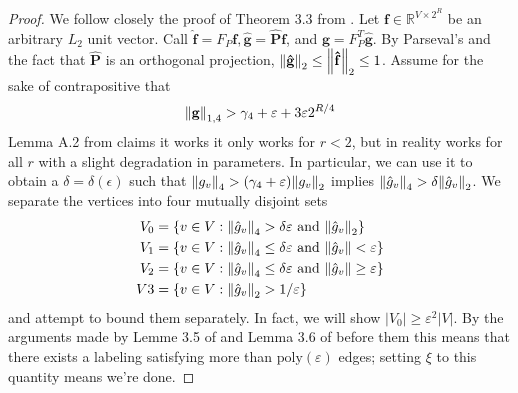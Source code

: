 \documentclass[10pt]{article}
\newcommand{\R}{\mathbb{R}}
\newcommand{\mbf}[1]{\mathbf{ #1 }}
\newcommand{\veps}{\varepsilon}
\begin{document}
\begin{proof}
We follow closely the proof of Theorem 3.3 from \cite{pqalmost}. Let $\mbf{f} \in \R^{V \times 2^R}$ be an arbitrary $L_2$ unit vector. Call $\mbf{\hat{f}} = F_P \mbf{f}, \mbf{\hat{g}} = \mbf{\hat{P}} \mbf{f}$, and $\mbf{g} = F_P^T \mbf{\hat{g}}$. By Parseval's and the fact that $\mbf{\hat{P}}$ is an orthogonal projection, $\norm{\mbf{\hat{g}}}_2 \leq \norm{\mbf{\hat{f}}}_2 \leq 1$. Assume for the sake of contrapositive that
\begin{align*}
    \norm{\mathbf{g}}_{1,4} > \gamma_4 + \veps + 3 \veps 2^{R/4}
\end{align*}
Lemma A.2 from \cite{pqalmost} claims it works it only works for $r < 2$, but in reality works for all $r$ with a slight degradation in parameters. In particular,
we can use it to obtain a $\delta = \delta(\epsilon)$ such that $\norm{g_v}_{4} > (\gamma_4 + \varepsilon) \norm{g_v}_2$ implies $\norm{\hat{g}_v}_4 > \delta \norm{\hat{g}_v}_2$.
We separate the vertices into four mutually disjoint sets 
\begin{align*}
V_0 &= \{ v \in V: \norm{\hat{g}_v}_4 > \delta \veps \text{ and } \norm{\hat{g}_v}_2 \} \\
V_1 &= \{v \in V : \norm{\hat{g}_v}_4 \le \delta \veps \text{ and } \norm{\hat{g}_v} < \veps\} \\
V_2 &= \{v \in V : \norm{\hat{g}_v}_4 \le \delta \veps \text{ and } \norm{\hat{g}_v} \ge \veps\} \\
V3 &= \{v \in V : \norm{\hat{g}_v}_2 > 1/\veps\}
\end{align*}
and attempt to bound them separately. In fact, we will show $|V_0| \ge \veps^2 |V|$. By the arguments made by Lemme 3.5 of \cite{pqalmost} and Lemma 3.6 of \cite{brs} before them this means that there exists a labeling satisfying more than $\textrm{poly}(\varepsilon)$ edges; setting $\xi$ to this quantity means we're done.


\end{proof}
\end{document}
